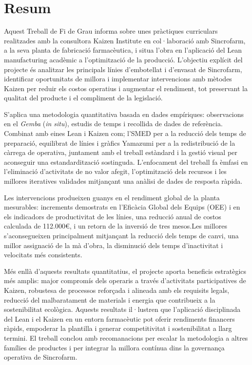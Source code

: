 \documentclass[]{article}
\begin{document}
\section*{Resum}\label{resum}
Aquest Treball de Fi de Grau informa sobre unes pràctiques curriculars realitzades amb la consultora Kaizen Institute en col·laboració amb Sincrofarm, a la seva planta de fabricació farmacèutica, i situa l'obra en l’aplicació del Lean manufacturing acadèmic a l’optimització de la producció. L’objectiu explícit del projecte és analitzar les principals línies d’embotellat i d’envasat de Sincrofarm, identificar oportunitats de millora i implementar intervencions amb mètodes Kaizen per reduir els costos operatius i augmentar el rendiment, tot preservant la qualitat del producte i el compliment de la legislació.

S'aplica una metodologia quantitativa basada en dades empíriques: observacions en el \textit{Gemba} (\textit{in situ}), estudis de temps i recollida de dades de referència. Combinat amb eines Lean i Kaizen com; l'SMED per a la reducció dels temps de preparació, equilibrat de línies i gràfics Yamazumi per a la redistribució de la càrrega de operativa, juntament amb el treball estàndard i la gestió visual per aconseguir una estandardització sostinguda. L’enfocament del treball fa èmfasi en l’eliminació d’activitats de no valor afegit, l’optimització dels recursos i les millores iteratives validades mitjançant una anàlisi de dades de resposta ràpida.

Les intervencions produeixen guanys en el rendiment global de la planta mesurables: increments demostrats en l’Eficàcia Global dels Equips (OEE) i en els indicadors de productivitat de les línies, una reducció anual de costos calculada de 112.000\euro, i un retorn de la inversió de tres mesos.Les millores s'aconsegueixen principalment mitjançant la reducció dels temps de canvi, una millor assignació de la mà d’obra, la disminució dels temps d’inactivitat i velocitats més consistents.

Més enllà d’aquests resultats quantitatius, el projecte aporta beneficis estratègics més amplis: major compromís dels operaris a través d’activitats participatives de Kaizen, robustesa de processos reforçada i alineada amb els requisits legals, reducció del malbaratament de materials i energia que contribueix a la sostenibilitat ecològica. Aquests resultats il·lustren que l’aplicació disciplinada del Lean i el Kaizen en un entorn farmacèutic pot oferir rendiments financers ràpids, empoderar la plantilla i generar competitivitat i sostenibilitat a llarg termini. El treball conclou amb recomanacions per escalar la metodologia a altres famílies de productes i per integrar la millora contínua dins la governança operativa de Sincrofarm.
\newpage
\end{document}

